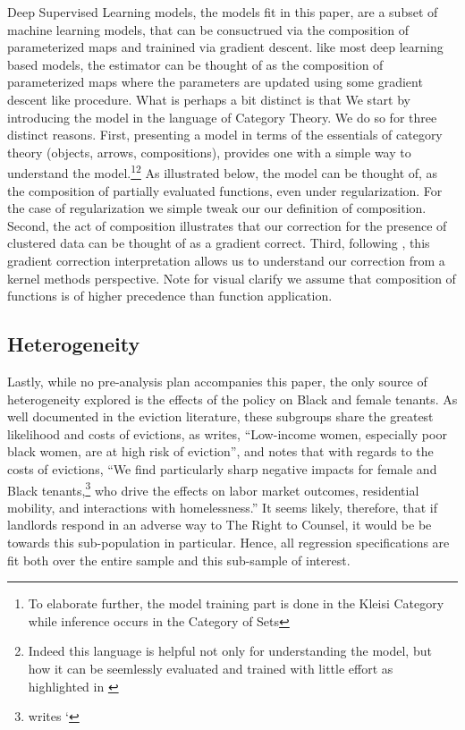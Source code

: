 \documentclass[a4paper,12pt]{article}
\begin{document}
Deep Supervised Learning models, the models fit in this paper, are a subset of machine learning models, that can be consuctrued via the composition of parameterized maps and trainined via gradient descent. 
like most deep learning based models, the estimator can be thought of as the composition of parameterized maps where the parameters are updated using some gradient descent like procedure. What is perhaps a bit distinct is that We start by introducing the model in the language of Category Theory. We do so for three distinct reasons. First, presenting a model in terms of the essentials of category theory (objects, arrows, compositions), provides one with a simple way to understand the model.\footnote{To elaborate further, the model training part is done in the Kleisi Category while inference occurs in the Category of Sets}\footnote{Indeed this language is helpful not only for understanding the model, but how it can be seemlessly evaluated and trained with little effort as highlighted in \cite{frostig2018compiling}} As illustrated below, the model can be thought of, as the composition of partially evaluated functions, even under regularization. For the case of regularization we simple tweak our our definition of composition. Second, the act of composition illustrates that our correction for the presence of clustered data can be thought of as a gradient correct. Third, following \cite{domingos2020every}, this gradient correction interpretation allows us to understand our correction from a kernel methods perspective. Note for visual clarify we assume that composition of functions is of higher precedence than function application.

 
\subsection{Heterogeneity}
Lastly, while no pre-analysis plan accompanies this paper, the only source of heterogeneity explored is the effects of the policy on Black and female tenants. As well documented in the eviction literature, these subgroups share the greatest likelihood and costs of evictions, as \cite{desmond2019unaffordable} writes, ``Low-income women, especially poor black women, are at high risk of eviction'', and \cite{collinson2022eviction} notes that with regards to the costs of evictions, ``We find particularly sharp negative impacts for female and Black tenants,\footnote{\cite{evans2019reducing} writes `} who drive the effects on labor market outcomes, residential mobility, and interactions with homelessness.'' It seems likely, therefore, that if landlords respond in an adverse way to The Right to Counsel, it would be be towards this sub-population in particular. Hence, all regression specifications are fit both over the entire sample and this sub-sample of interest. 
\end{document}
